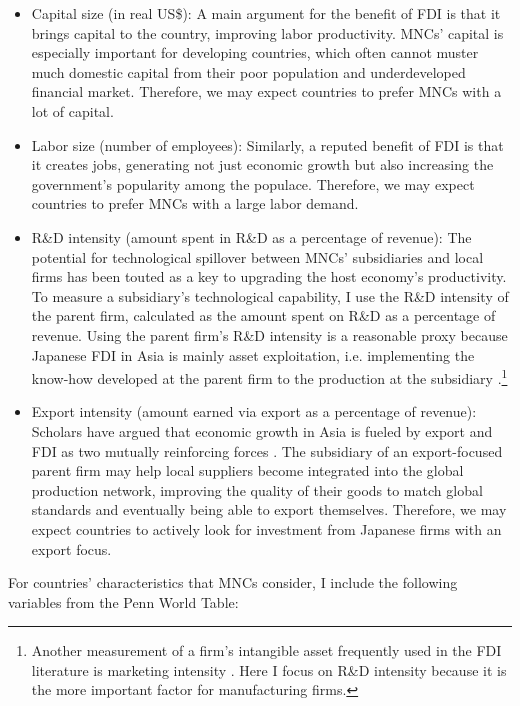 \begin{itemize}
\item Capital size (in real US\$): A main argument for the benefit of FDI is
  that it brings capital to the country, improving labor productivity. MNCs'
  capital is especially important for developing countries, which often cannot
  muster much domestic capital from their poor population and underdeveloped
  financial market. Therefore, we may expect countries to prefer MNCs with a lot
  of capital.

\item Labor size (number of employees): Similarly, a reputed benefit of FDI is
  that it creates jobs, generating not just economic growth but also increasing
  the government's popularity among the populace. Therefore, we may expect
  countries to prefer MNCs with a large labor demand.

\item R\&D intensity (amount spent in R\&D as a percentage of revenue): The
  potential for technological spillover between MNCs' subsidiaries and local
  firms has been touted as a key to upgrading the host economy's productivity. To
  measure a subsidiary's technological capability, I use the R\&D intensity of
  the parent firm, calculated as the amount spent on R\&D as a percentage of
  revenue. Using the parent firm's R\&D intensity is a reasonable proxy because
  Japanese FDI in Asia is mainly asset exploitation, i.e. implementing the
  know-how developed at the parent firm to the production at the subsidiary
  \citep{Pak2005}.\footnote{Another measurement of a firm's intangible asset
    frequently used in the FDI literature is marketing intensity
    \citep{Girma2005}. Here I focus on R\&D intensity because it is the more
    important factor for manufacturing firms.}

\item Export intensity (amount earned via export as a percentage of revenue):
  Scholars have argued that economic growth in Asia is fueled by export and FDI
  as two mutually reinforcing forces \citep{Liu2002}. The subsidiary of an
  export-focused parent firm may help local suppliers become integrated into
  the global production network, improving the quality of their goods to match
  global standards and eventually being able to export themselves. Therefore, we
  may expect countries to actively look for investment from
  Japanese firms with an export focus.
\end{itemize}

For countries' characteristics that MNCs consider, I include the following
variables from the Penn World Table:

